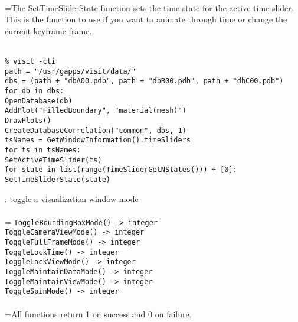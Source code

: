 \documentclass[10pt,a4paper]{report}
\begin{document}
 \\ 
\hangindent=\parindent The SetTimeSliderState function sets the time state for the active time slider. This is the function to use if you want to animate through time or change the current keyframe frame. \\[-3mm] 

\\[-6mm]
\begin{verbatim}% visit -cli
path = "/usr/gapps/visit/data/"
dbs = (path + "dbA00.pdb", path + "dbB00.pdb", path + "dbC00.pdb")
for db in dbs:
OpenDatabase(db)
AddPlot("FilledBoundary", "material(mesh)")
DrawPlots()
CreateDatabaseCorrelation("common", dbs, 1)
tsNames = GetWindowInformation().timeSliders
for ts in tsNames:
SetActiveTimeSlider(ts)
for state in list(range(TimeSliderGetNStates())) + [0]:
SetTimeSliderState(state)
\end{verbatim}
\newpage


{}
: toggle a visualization window mode\\[-3mm]

 \\ 
\hangindent=\parindent 
\verb!ToggleBoundingBoxMode() -> integer!\\ 
\verb!ToggleCameraViewMode() -> integer!\\ 
\verb!ToggleFullFrameMode() -> integer!\\ 
\verb!ToggleLockTime() -> integer!\\ 
\verb!ToggleLockViewMode() -> integer!\\ 
\verb!ToggleMaintainDataMode() -> integer!\\ 
\verb!ToggleMaintainViewMode() -> integer!\\ 
\verb!ToggleSpinMode() -> integer!\\ [-3mm]

 \\ 
\hangindent=\parindent All functions return 1 on success and 0 on failure. \\[-3mm] 
\end{document}
